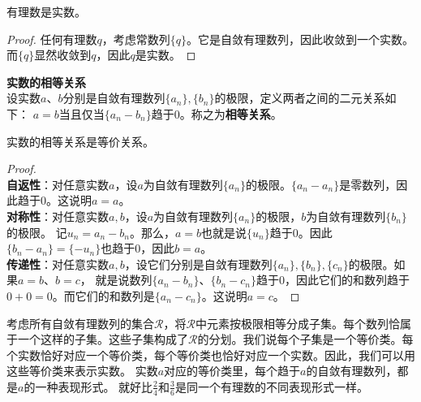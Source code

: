 \documentclass[12pt,UTF8,fontset=none]{ctexbook}
\begin{document}
\begin{appendix}
\begin{tm}\label{tm:a-1-5}
    有理数是实数。
\end{tm}
\begin{proof}
    任何有理数$q$，考虑常数列$\{q\}$。它是自敛有理数列，因此收敛到一个实数。而$\{q\}$显然收敛到$q$，因此$q$是实数。
\end{proof}

\begin{df}\textbf{实数的相等关系}\\
    设实数$a$、$b$分别是自敛有理数列$\{a_n\}, \{b_n\}$的极限，定义两者之间的二元关系如下：
    $a = b$当且仅当$\{a_n - b_n\}$趋于$0$。称之为\textbf{相等关系}。
\end{df}

\begin{tm}\label{tm:a-1-10}
    实数的相等关系是等价关系。
\end{tm}
\begin{proof}
    \mbox{} \\
    \textbf{自返性}：对任意实数$a$，设$a$为自敛有理数列$\{a_n\}$的极限。$\{a_n - a_n\}$是零数列，因此趋于$0$。这说明$a = a$。\\
    \textbf{对称性}：对任意实数$a, b$，设$a$为自敛有理数列$\{a_n\}$的极限，$b$为自敛有理数列$\{b_n\}$的极限。
    记$u_n = a_n - b_n$。那么，$a = b$也就是说$\{u_n\}$趋于$0$。因此$\{b_n - a_n\} = \{-u_n\}$也趋于$0$，因此$b = a$。\\
    \textbf{传递性}：对任意实数$a, b$，设它们分别是自敛有理数列$\{a_n\}, \{b_n\}, \{c_n\}$的极限。如果$a=b$、$b=c$，
    就是说数列$\{a_n - b_n\}$、$\{b_n - c_n\}$趋于$0$，因此它们的和数列趋于$0+0=0$。而它们的和数列是$\{a_n - c_n\}$。这说明$a=c$。
\end{proof}

考虑所有自敛有理数列的集合$\mathcal{R}$，将$\mathcal{R}$中元素按极限相等分成子集。每个数列恰属于一个这样的子集。这些子集构成了$\mathcal{R}$的分划。我们说每个子集是一个等价类。每个实数恰好对应一个等价类，每个等价类也恰好对应一个实数。因此，我们可以用这些等价类来表示实数。
实数$a$对应的等价类里，每个趋于$a$的自敛有理数列，都是$a$的一种表现形式。
就好比$\frac{2}{4}$和$\frac{3}{6}$是同一个有理数的不同表现形式一样。


\end{appendix}
\end{document}
